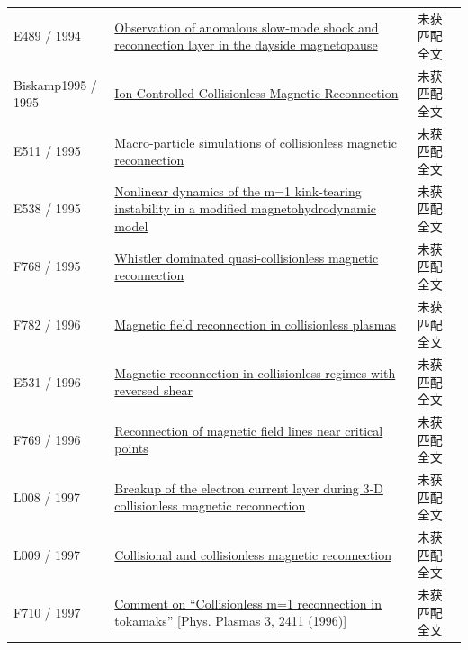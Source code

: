 \documentclass[UTF8,a4paper,11pt,openany,fontset=fandol]{ctexbook}
\begin{document}
\begin{longtable}{P{24mm}P{97mm}P{27mm}}
E489 / 1994 & \href{https://doi.org/10.1029/94ja01767}{Observation of anomalous slow‐mode shock and reconnection layer in the dayside magnetopause} & 未获匹配全文\\

Biskamp1995 / 1995 & \href{https://doi.org/10.1103/physrevlett.75.3850}{Ion-Controlled Collisionless Magnetic Reconnection} & 未获匹配全文\\

E511 / 1995 & \href{https://doi.org/10.1063/1.871192}{Macro-particle simulations of collisionless magnetic reconnection} & 未获匹配全文\\

E538 / 1995 & \href{https://doi.org/10.1063/1.871088}{Nonlinear dynamics of the m=1 kink-tearing instability in a modified magnetohydrodynamic model} & 未获匹配全文\\

F768 / 1995 & \href{http://hdl.handle.net/10068/262417}{Whistler dominated quasi-collisionless magnetic reconnection} & 未获匹配全文\\

F782 / 1996 & \href{http://www.osti.gov/scitech/biblio/489441-magnetic-field-reconnection-collisionless-plasmas}{Magnetic field reconnection in collisionless plasmas} & 未获匹配全文\\

E531 / 1996 & \href{http://www.osti.gov/scitech/biblio/489565-magnetic-reconnection-collisionless-regimes-reversed-shear}{Magnetic reconnection in collisionless regimes with reversed shear} & 未获匹配全文\\

F769 / 1996 & \href{http://hdl.handle.net/11568/54239}{Reconnection of magnetic field lines near critical points} & 未获匹配全文\\

L008 / 1997 & \href{https://doi.org/10.1029/97gl52961}{Breakup of the electron current layer during 3‐D collisionless magnetic reconnection} & 未获匹配全文\\

L009 / 1997 & \href{https://doi.org/10.1063/1.872338}{Collisional and collisionless magnetic reconnection} & 未获匹配全文\\

F710 / 1997 & \href{https://doi.org/10.1063/1.872215}{Comment on “Collisionless m=1 reconnection in tokamaks” [Phys. Plasmas 3,  2411 (1996)]} & 未获匹配全文\\


\end{longtable}
\end{document}
